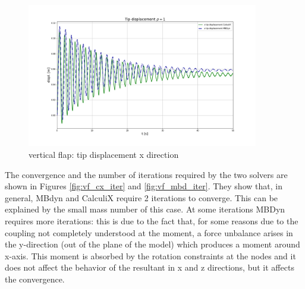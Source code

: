 \begin{figure}[htbp!]
	\centering
	\includegraphics[width=0.9\textwidth]{images/vert_flap/disp_rho1.png}
	\caption{vertical flap: tip displacement x direction}
	\label{fig:vf_displacement}
\end{figure}

The convergence and the number of iterations required by the two solvers are shown in Figures \ref{fig:vf_cx_iter} and \ref{fig:vf_mbd_iter}. They show that, in general, MBdyn and CalculiX require 2 iterations to converge. This can be explained by the small mass number of this case. At some iterations MBDyn requires more iterations: this is due to the fact that, for some reasons due to the coupling not completely understood at the moment, a force unbalance arises in the y-direction (out of the plane of the model) which produces a moment around x-axis. This moment is absorbed by the rotation constraints at the nodes and it does not affect the behavior of the resultant in x and z directions, but it affects the convergence. 


